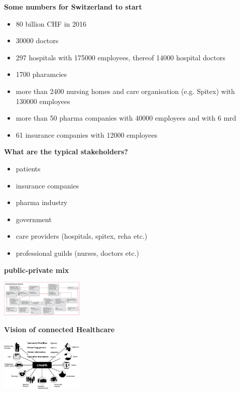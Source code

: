 \documentclass{report}
\newenvironment{Figure}
	{\par\medskip\noindent\minipage{\linewidth}}
	{\endminipage\par\medskip}
\theoremstyle{definition}
\theoremstyle{example}
\begin{document}
\textbf{Some numbers for Switzerland to start}
\begin{itemize}
   \item 80 billion CHF in 2016
   \item 30000 doctors
   \item 297 hospitals with 175000 employees, thereof 14000 hospital doctors
   \item 1700 pharamcies
   \item more than 2400 nursing homes and care organisation (e.g. Spitex) with 130000 employees
   \item more than 50 pharma companies with 40000 employees and with 6 mrd
   \item 61 insurance companies with 12000 employees
\end{itemize}

\textbf{What are the typical stakeholders?}
\begin{itemize}
   \item patients
   \item insurance companies
   \item pharma industry
   \item government
   \item care providers (hospitals, spitex, reha etc.)
   \item professional guilds (nurses, doctors etc.)
\end{itemize}

\textbf{public-private mix}
\begin{Figure}
   \centering
    \includegraphics[width=150px]{img/publicprivatemix.png}
        \label{fig:public private mix}
    \end{Figure}

\textbf{Vision of connected Healthcare}
\begin{Figure}
   \centering
    \includegraphics[width=150px]{img/vision.png}
        \label{fig:vision of healthcare in the future}
    \end{Figure}
\end{document}
